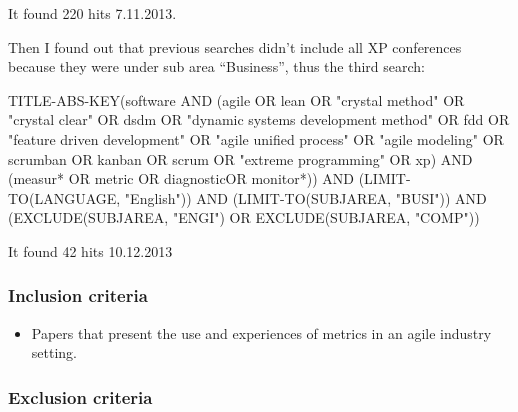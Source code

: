 \documentclass{sig-alternate}
\begin{document}
It found 220 hits 7.11.2013.

Then I found out that previous searches didn't include all XP conferences
because they were under sub area ``Business'', thus the third search:

TITLE-ABS-KEY(software AND (agile OR lean OR "crystal method" OR "crystal
clear" OR dsdm OR "dynamic systems development method" OR fdd OR "feature
driven development" OR "agile unified process" OR "agile modeling" OR scrumban
OR kanban OR scrum OR "extreme programming" OR xp) AND (measur* OR metric OR
diagnosticOR monitor*)) AND (LIMIT-TO(LANGUAGE, "English")) AND
(LIMIT-TO(SUBJAREA, "BUSI")) AND (EXCLUDE(SUBJAREA, "ENGI") OR
EXCLUDE(SUBJAREA, "COMP"))

It found 42 hits 10.12.2013

\subsubsection{Inclusion criteria}

\begin{itemize}
  \item Papers that present the use and experiences of metrics in an agile
  industry setting.
\end{itemize}

\subsubsection{Exclusion criteria}
\end{document}

